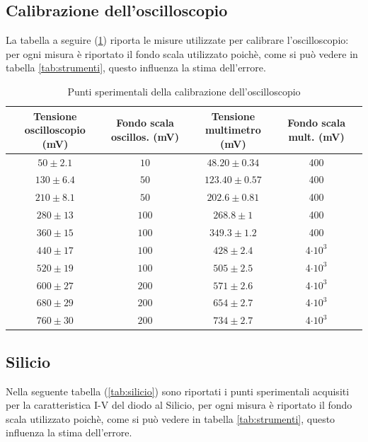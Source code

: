\documentclass[]{article}
\begin{document}
\subsection{Calibrazione dell'oscilloscopio}
La tabella a seguire (\ref{tab:calibrazione}) riporta le misure utilizzate per calibrare l'oscilloscopio: per ogni misura è riportato il fondo scala utilizzato poichè, come si può vedere in tabella \ref{tab:strumenti}, questo influenza la stima dell'errore. 
	\begin{table}[H]
		\centering
	\begin{tabular}{|c|c|c|c|c|}
		\hline
		Tensione oscilloscopio (mV)& Fondo scala oscillos. (mV) & Tensione multimetro (mV) & Fondo scala mult. (mV) \\
		\hline
		$ 50\pm 2.1 $ &$ 10 $ & $ 48.20\pm 0.34 $ &400\\
		\hline
		$ 130\pm 6.4$ &$ 50 $ & $ 123.40\pm 0.57 $ &400\\
		\hline
		$ 210\pm 8.1 $ &$ 50 $ & $ 202.6\pm 0.81 $ &400\\
		\hline
		$ 280\pm 13$ &$ 100 $ & $ 268.8\pm 1 $ &400\\
		\hline
		$ 360\pm 15 $ &$ 100 $ & $ 349.3\pm 1.2 $ &400\\
		\hline
		$ 440\pm 17 $ &$ 100 $ & $ 428\pm 2.4 $ &4$\cdot10^3$\\
		\hline
		$ 520\pm 19 $ &$ 100 $ & $ 505\pm 2.5 $ &4$\cdot10^3$\\
		\hline
		$ 600\pm 27 $ &$ 200 $ & $ 571\pm 2.6 $ &4$\cdot10^3$\\
		\hline
		$ 680\pm 29 $ &$ 200 $ & $ 654\pm 2.7 $&4$\cdot10^3$ \\
		\hline
		$ 760\pm 30 $ &$ 200 $ & $ 734\pm 2.7 $&4$\cdot10^3$ \\
		\hline
		
	\end{tabular}
\caption{Punti sperimentali della calibrazione dell'oscilloscopio}
\label{tab:calibrazione}
\end{table}

\pagebreak
\subsection{Silicio}
Nella seguente tabella (\ref{tab:silicio}) sono riportati i punti sperimentali acquisiti per la caratteristica I-V del diodo al Silicio, per ogni misura è riportato il fondo scala utilizzato poichè, come si può vedere in tabella \ref{tab:strumenti}, questo influenza la stima dell'errore.
\end{document}
